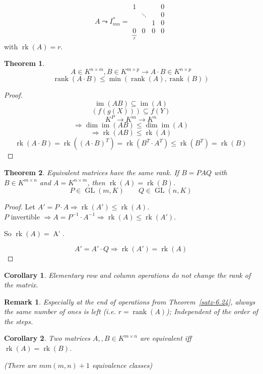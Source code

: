 \documentclass[a4paper,landscape,twocolumn]{article}
\newtheorem{theorem}{Theorem}
\newtheorem{rem}{Remark}
\newtheorem{cor}{Corollary}
\DeclareMathOperator\image{im} %
\begin{document}
\[
  A \leadsto I_{mn}^* =
  \begin{matrix}
    1 &        &   & 0 \\
      & \ddots &   & 0 \\
      &        & 1 & 0 \\
    \underbrace{0}_r & 0      & 0 & 0
  \end{matrix}
\]
with $\operatorname{rk}(A) = r$.

\begin{theorem}
  \[ A \in K^{n\times m}, B \in K^{m \times p} \to A \cdot B \in K^{n\times p} \]
  \[ \operatorname{rank}(A \cdot B) \leq \min(\operatorname{rank}(A), \operatorname{rank}(B)) \]
\end{theorem}
\begin{proof}
  \[ \operatorname{im}(AB) \subseteq \operatorname{im}(A) \]
  \[ (f(g(X))) \subseteq f(Y) \]
  \[ K^P \to K^m \to K^n \]
  \[ \Rightarrow \dim{\image(AB)} \leq \dim{\image(A)} \]
  \[ \Rightarrow \operatorname{rk}(AB) \leq \operatorname{rk}(A) \]
  \[ \operatorname{rk}(A\cdot B) = \operatorname{rk}\left((A\cdot B)^T\right) = \operatorname{rk}(B^T \cdot A^T) \leq \operatorname{rk}(B^T) = \operatorname{rk}(B) \]
\end{proof}

\begin{theorem}
  \label{satz-6.30}
  Equivalent matrices have the same rank.
  If $B = P A Q$ with $B \in K^{m\times n}$ and $A = K^{n\times m}$,
  then $\operatorname{rk}(A) = \operatorname{rk}(B)$.
  \[ P \in \operatorname{GL}(m, K) \qquad Q \in \operatorname{GL}(n, K) \]
\end{theorem}
\begin{proof}
  Let $A' = P \cdot A \Rightarrow \operatorname{rk}(A') \leq \operatorname{rk}(A)$. \\
  $P$ invertible $\Rightarrow A = P^{-1} \cdot A^{-1} \Rightarrow \operatorname{rk}(A) \leq \operatorname{rk}(A')$.

  So $\operatorname{rk}(A) = \operatorname{A'}$.

  \[ A' = A' \cdot Q \Rightarrow \operatorname{rk}(A') = \operatorname{rk}(A) \]
\end{proof}

\begin{cor}
  \label{korollar-6.31}
  Elementary row and column operations do not change the rank of the matrix.
\end{cor}
\begin{rem}
  \label{bemerkung-3.32}
  Especially at the end of operations from Theorem~\ref{satz-6.24},
  always the same number of ones is left (i.e. $r = \operatorname{rank}(A)$);
  Independent of the order of the steps.
\end{rem}
\begin{cor}
  \label{korollar-6.33}
  Two matrices $A,, B \in K^{m\times n}$ are equivalent iff $\operatorname{rk}(A) = \operatorname{rk}(B)$.

  (There are $mm(m,n) + 1$ equivalence classes)
\end{cor}
\end{document}
